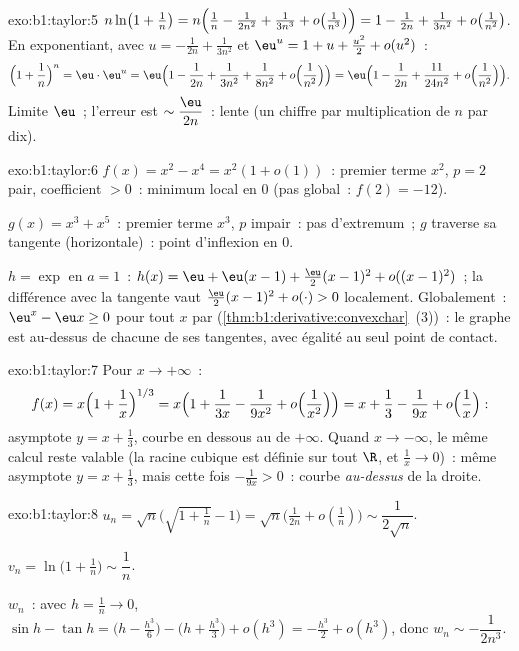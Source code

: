 \begin{solution}{exo:b1:taylor:5}
$n\ln\bigl(1 + \frac1n\bigr) = n\Bigl(\frac1n - \frac{1}{2n^2} +
\frac{1}{3n^3} + o\bigl(\frac{1}{n^3}\bigr)\Bigr) = 1 - \frac{1}{2n}
+ \frac{1}{3n^2} + o\bigl(\frac{1}{n^2}\bigr)$. En exponentiant, avec
$u = -\frac{1}{2n} + \frac{1}{3n^2}$ et $\eu^u = 1 + u + \frac{u^2}2
+ o(u^2)$~:
\[
\Bigl(1 + \frac1n\Bigr)^n = \eu\cdot \eu^{u}
= \eu\Bigl(1 - \frac{1}{2n} + \frac{1}{3n^2} + \frac{1}{8n^2}
+ o\Bigl(\frac{1}{n^2}\Bigr)\Bigr)
= \eu\Bigl(1 - \frac{1}{2n} + \frac{11}{24n^2} +
o\Bigl(\frac{1}{n^2}\Bigr)\Bigr).
\]
Limite $\eu$~; l'erreur est $\sim \dfrac{\eu}{2n}$~: lente (un chiffre
par multiplication de $n$ par dix).
\end{solution}

\begin{solution}{exo:b1:taylor:6}
$f(x) = x^2 - x^4 = x^2(1 + o(1))$~: premier terme $x^2$, $p = 2$ pair,
coefficient $> 0$~: minimum local en $0$ (pas global~: $f(2) = -12$).

$g(x) = x^3 + x^5$~: premier terme $x^3$, $p$ impair~: pas d'extremum~;
$g$ traverse sa tangente (horizontale)~: point d'inflexion en $0$.

$h = \exp$ en $a = 1$~: $h(x) = \eu + \eu(x-1) + \frac{\eu}{2}(x-1)^2
+ o((x-1)^2)$~; la différence avec la tangente vaut
$\frac{\eu}{2}(x-1)^2 + o(\cdot) > 0$ localement. Globalement~: $\eu^x -
\eu x \geq 0$ pour tout $x$ par 
(\cref{thm:b1:derivative:convexchar}~(3))~: le graphe est au-dessus de
chacune de ses tangentes, avec égalité au seul point de contact.
\end{solution}

\begin{solution}{exo:b1:taylor:7}
Pour $x \to +\infty$~:
\[
f(x) = x\Bigl(1 + \frac1x\Bigr)^{1/3}
= x\Bigl(1 + \frac{1}{3x} - \frac{1}{9x^2} +
o\Bigl(\frac{1}{x^2}\Bigr)\Bigr)
= x + \frac13 - \frac{1}{9x} + o\Bigl(\frac1x\Bigr):
\]
asymptote $y = x + \frac13$, courbe en dessous au  de
$+\infty$. Quand $x \to -\infty$, le même calcul reste valable (la
racine cubique est définie sur tout $\R$, et $\frac1x \to 0$)~: même
asymptote $y = x + \frac13$, mais cette fois $-\frac{1}{9x} > 0$~:
courbe \emph{au-dessus} de la droite.
\end{solution}

\begin{solution}{exo:b1:taylor:8}
$u_n = \sqrt n\bigl(\sqrt{1 + \tfrac1n} - 1\bigr) = \sqrt
n\bigl(\frac{1}{2n} + o(\frac1n)\bigr) \sim \dfrac{1}{2\sqrt n}$.

$v_n = \ln\bigl(1 + \frac1n\bigr) \sim \dfrac 1n$.

$w_n$~: avec $h = \frac1n \to 0$, $\sin h - \tan h = \bigl(h -
\frac{h^3}{6}\bigr) - \bigl(h + \frac{h^3}{3}\bigr) + o(h^3) =
-\frac{h^3}{2} + o(h^3)$, donc $w_n \sim -\dfrac{1}{2n^3}$.
\end{solution}

